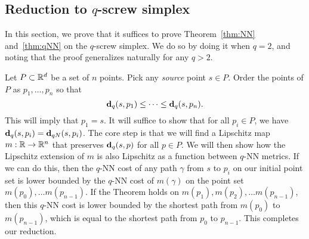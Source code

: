 \subsection{Reduction to $q$-screw simplex} %
\label{sec:reduction-to-screw}
In this section, we prove that it suffices to prove Theorem~\ref{thm:NN}
and~\ref{thm:qNN} on the $q$-screw simplex. We do so by doing it when
$q=2$, and noting that the proof generalizes naturally for any $q > 2$.

  Let $P\subset \mathbb{R}^d$ be a set of $n$ points.
  Pick any \emph{source} point $s\in P$.
  Order the points of $P$ as $p_1,\ldots ,p_n$ so that
  \[
    \mathbf{d}_q(s,p_1) \le \cdots \le \mathbf{d}_q(s, p_n).
  \]
  This will imply that $p_1 = s$.
  It will suffice to show that for all $p_i\in P$, we have $\mathbf{d}_q(s,p_i)
= \mathbf{d}_{qN}(s,p_i)$.
The core step is that we will find a Lipschitz map $m: \mathbb{R} \rightarrow \mathbb{R}^n$
that preserves $\mathbf{d}_q(s,p)$ for all $p \in P$. We will then show how the
Lipschitz extension of $m$ is also Lipschitz as a function between $q$-NN
metrics. If we can do this, then the $q$-NN cost of any path $\gamma$ from $s$ to
$p_i$ on our initial point set is lower bounded by the $q$-NN cost of
$m(\gamma)$ on the point set $m(p_0), \ldots m(p_{n-1})$.
If the Theorem holds on $m(p_1), m(p_2), \ldots
m(p_{n-1})$, then this $q$-NN cost is lower bounded by the shortest path
from $m(p_0)$ to $m(p_{n-1})$, which is equal to the shortest path from
$p_0$ to $p_{n-1}$. This completes our reduction.
  
  
  
  
